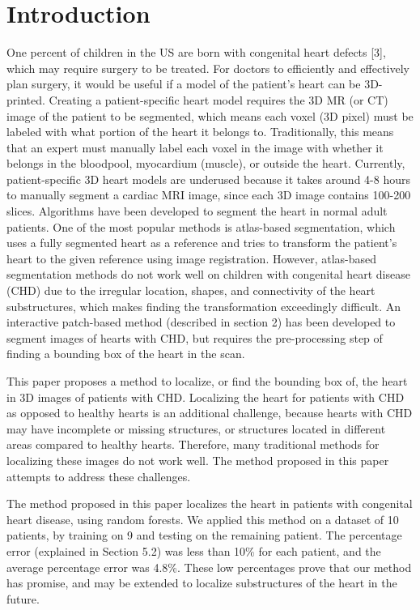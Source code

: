 \section{Introduction}
One percent of children in the US are born with congenital heart defects [3], which may require surgery to be treated. For doctors to efficiently and effectively plan surgery, it would be useful if a model of the patient's heart can be 3D-printed. Creating a patient-specific heart model requires the 3D MR (or CT) image of the patient to be segmented, which means each voxel (3D pixel) must be labeled with what portion of the heart it belongs to. Traditionally, this means that an expert must manually label each voxel in the image with whether it belongs in the bloodpool, myocardium (muscle), or outside the heart. Currently, patient-specific 3D heart models are underused because it takes around 4-8 hours to manually segment a cardiac MRI image, since each 3D image contains 100-200 slices. Algorithms have been developed to segment the heart in normal adult patients. One of the most popular methods is atlas-based segmentation, which uses a fully segmented heart as a reference and tries to transform the patient's heart to the given reference using image registration. However, atlas-based segmentation methods do not work well on children with congenital heart disease (CHD) due to the irregular location, shapes, and connectivity of the heart substructures, which makes finding the transformation exceedingly difficult. An interactive patch-based method (described in section 2) has been developed to segment images of hearts with CHD, but requires the pre-processing step of finding a bounding box of the heart in the scan.

This paper proposes a method to localize, or find the bounding box of, the heart in 3D images of patients with CHD. Localizing the heart for patients with CHD as opposed to healthy hearts is an additional challenge, because hearts with CHD may have incomplete or missing structures, or structures located in different areas compared to healthy hearts. Therefore, many traditional methods for localizing these images do not work well. The method proposed in this paper attempts to address these challenges.

The method proposed in this paper localizes the heart in patients with congenital heart disease, using random forests. We applied this method on a dataset of 10 patients, by training on 9 and testing on the remaining patient. The percentage error (explained in Section 5.2) was less than 10\% for each patient, and the average percentage error was 4.8\%. These low percentages prove that our method has promise, and may be extended to localize substructures of the heart in the future.

